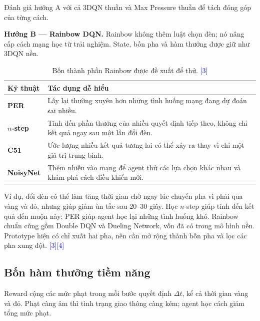 \documentclass[11pt,a4paper,headings=small,parskip=half]{scrartcl}
\newcommand{\src}[1]{\textcolor{blue}{[#1]}}
\begin{document}
Đánh giá hướng A với cả 3DQN thuần và Max Pressure thuần để tách đóng góp của từng cách.

\textbf{Hướng B — Rainbow DQN.} Rainbow không thêm luật chọn đèn; nó nâng cấp cách mạng học từ trải nghiệm. State, bốn pha và hàm thưởng được giữ như 3DQN nền.

\begin{table}[H]\centering\small
\begin{tabularx}{\linewidth}{>{\bfseries}p{28mm}X}
\toprule Kỹ thuật & Tác dụng dễ hiểu \\ \midrule
PER & Lấy lại thường xuyên hơn những tình huống mạng đang dự đoán sai nhiều. \\[1mm]
$n$-step & Tính đến phần thưởng của nhiều quyết định tiếp theo, không chỉ kết quả ngay sau một lần đổi đèn. \\[1mm]
C51 & Ước lượng nhiều kết quả tương lai có thể xảy ra thay vì chỉ một giá trị trung bình. \\[1mm]
NoisyNet & Thêm nhiễu vào mạng để agent thử các lựa chọn khác nhau và khám phá cách điều khiển mới. \\
\bottomrule
\end{tabularx}
\caption{Bốn thành phần Rainbow được đề xuất để thử. \src{3}}
\end{table}

Ví dụ, đổi đèn có thể làm tăng thời gian chờ ngay lúc chuyển pha vì phải qua vàng và đỏ, nhưng giúp giảm ùn tắc sau 20--30 giây. Học $n$-step giúp tính đến kết quả đến muộn này; PER giúp agent học lại những tình huống khó. Rainbow chuẩn cũng gồm Double DQN và Dueling Network, vốn đã có trong mô hình nền. Prototype hiện có chỉ xuất hai pha, nên cần mở rộng thành bốn pha và lọc các pha xung đột. \src{3}\src{4}

\newpage
\subsection{Bốn hàm thưởng tiềm năng}
Reward cộng các mức phạt trong mỗi bước quyết định $\Delta t$, kể cả thời gian vàng và đỏ. Phạt càng âm thì tình trạng giao thông càng kém; agent học cách giảm tổng mức phạt.
\end{document}
